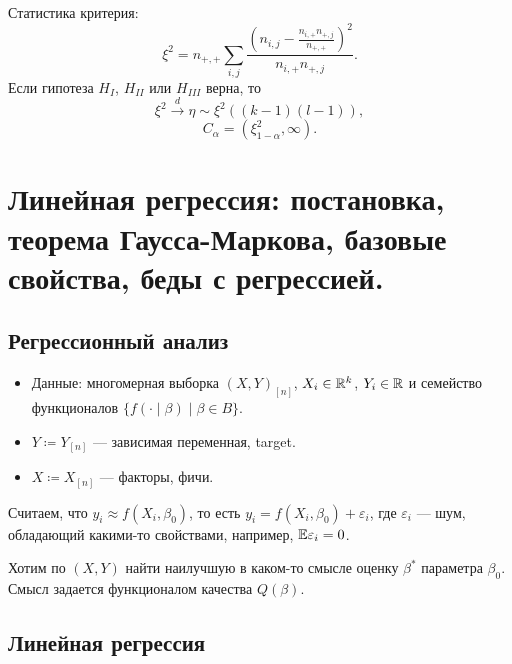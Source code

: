 \documentclass[11pt]{book}
\begin{document}
Статистика критерия:  \[
\xi^2 = n_{+, +} \sum_{i, j}^{} \frac{\left( n_{i, j} - \frac{n_{i, +} n_{+, j}}{n_{+, +}}\right) ^2}{n_{i, +}n_{+, j}}
.\] 
Если гипотеза $H_{I}$, $H_{II}$ или $H_{III}$ верна, то
\[
\xi^2 \xrightarrow{d} \eta \sim \xi^2\left((k-1)(l-1)\right)
,\] 
\[
C_{\alpha} = (\xi^2_{1-\alpha}, \infty)
.\] 

\section{Линейная регрессия: постановка, теорема Гаусса-Маркова, базовые свойства, беды с регрессией.}
\subsection{Регрессионный анализ}
\begin{itemize}
	\item Данные: многомерная выборка $(X, Y)_{[n]}$, $X_i \in \mathbb{R}^{k}$, $Y_i \in \mathbb{R}$ и семейство функционалов $\{f(\cdot \mid \beta) \mid \beta \in B\}$.
	\item $Y \coloneqq Y_{[n]}$ --- зависимая переменная, target.
	\item $X \coloneqq X_{[n]}$ --- факторы, фичи.
\end{itemize}
Считаем, что $y_i \approx f(X_i, \beta_0)$, то есть $y_i = f(X_i, \beta_0) + \varepsilon_i$, где $\varepsilon_i$ --- шум, обладающий какими-то свойствами, например, $\mathbb{E} \varepsilon_i = 0$.

Хотим по $(X, Y)$ найти наилучшую в каком-то смысле оценку $\beta^*$ параметра $\beta_0$. Смысл задается функционалом качества $Q(\beta)$.

\subsection{Линейная регрессия}
\end{document}
